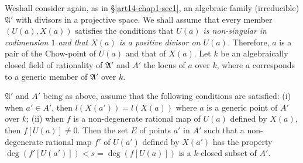 We\pageoriginale shall consider again, as in \S\ref{art14-chap1-sec1}, an algebraic family (irreducible) $\mathfrak{A}'$ with divisors in a projective space. We shall assume that every member $(U(a),X(a))$ satisfies the conditions that $U(a)$ {\em is non-singular in codimension $1$ and that $X(a)$ is a positive divisor on $U(a)$.} Therefore, $a$ is a pair of the Chow-point of $U(a)$ and that of $X(a)$. Let $k$ be an algebraically closed field of rationality of $\mathfrak{A}'$ and $A'$ the locus of $a$ over $k$, where $a$ corresponds to a generic member of $\mathfrak{A}'$ over $k$.

\begin{subprop}\label{art14-app-prop2.2}
$\mathfrak{A}'$ and $A'$ being as above, assume that the following conditions are satisfied: {\rm(i)} when $a'\in A'$, then $l(X(a'))=l(X(a))$ where $a$ is a generic point of $A'$ over $k$; {\rm(ii)} when $f$ is a non-degenerate rational map of $U(a)$ defined by $X(a)$, then $f[U(a)]\neq 0$. Then the set $E$ of points $a'$ in $A'$ such that a non-degenerate rational map $f'$ of $U(a')$ defined by $X(a')$ has the property $\deg (f'[U(a')])<s=\deg (f[U(a)])$ is a $k$-closed subset of $A'$.
\end{subprop}

